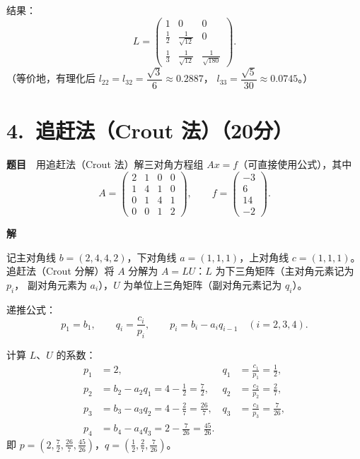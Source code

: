 \documentclass[a4paper,11pt]{ctexart}
\begin{document}
结果：
\[
  L=\begin{pmatrix}
    1 & 0 & 0\\
    \tfrac12 & \tfrac{1}{\sqrt{12}} & 0\\
    \tfrac13 & \tfrac{1}{\sqrt{12}} & \tfrac{1}{\sqrt{180}}
  \end{pmatrix}.
\]
（等价地，有理化后 $l_{22}=l_{32}=\dfrac{\sqrt3}{6}\approx0.2887$，
$l_{33}=\dfrac{\sqrt5}{30}\approx0.0745$。）

\section*{4.\ 追赶法（Crout 法）（20分）}

\textbf{题目}　用追赶法（Crout 法）解三对角方程组 $Ax=f$（可直接使用公式），其中
\[
  A=\begin{pmatrix}
    2 & 1 & 0 & 0\\
    1 & 4 & 1 & 0\\
    0 & 1 & 4 & 1\\
    0 & 0 & 1 & 2
  \end{pmatrix},\qquad
  f=\begin{pmatrix}-3\\6\\14\\-2\end{pmatrix}.
\]

\textbf{解}

记主对角线 $b=(2,4,4,2)$，下对角线 $a=(1,1,1)$，上对角线 $c=(1,1,1)$。
追赶法（Crout 分解）将 $A$ 分解为 $A=LU$：$L$ 为下三角矩阵（主对角元素记为 $p_i$，
副对角元素为 $a_i$），$U$ 为单位上三角矩阵（副对角元素记为 $q_i$）。

递推公式：
\[
  p_1=b_1,\qquad q_i=\frac{c_i}{p_i},\qquad p_i=b_i-a_iq_{i-1}\quad(i=2,3,4).
\]

计算 $L$、$U$ 的系数：
\[
  \begin{aligned}
    p_1&=2, & q_1&=\frac{c_1}{p_1}=\frac12,\\
    p_2&=b_2-a_2q_1=4-\tfrac12=\tfrac72, & q_2&=\frac{c_2}{p_2}=\frac27,\\
    p_3&=b_3-a_3q_2=4-\tfrac27=\tfrac{26}{7}, & q_3&=\frac{c_3}{p_3}=\frac{7}{26},\\
    p_4&=b_4-a_4q_3=2-\tfrac{7}{26}=\tfrac{45}{26}.
  \end{aligned}
\]
即 $p=(2,\tfrac72,\tfrac{26}{7},\tfrac{45}{26})$，$q=(\tfrac12,\tfrac27,\tfrac{7}{26})$。
\end{document}
